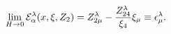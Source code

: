 \begin{equation}\label{eq:vectlim}
\lim_{H\rightarrow 0}{\cal
E}_{\alpha}^{\lambda}(x,\xi,Z_2)=Z_{2\mu}^{\lambda}-\frac{Z_{24}^{\lambda}}{\xi_{4}}\xi_{\mu}\equiv\epsilon_{\mu}^{\lambda}.
\end{equation}

